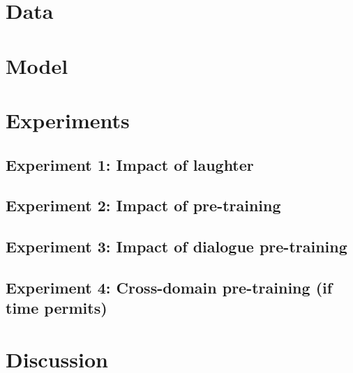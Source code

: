 \documentclass[11pt,a4paper]{article}
\begin{document}
\section{Data}
  
\section{Model} %

\section{Experiments}
\subsection{Experiment 1: Impact of laughter}   %

\subsection{Experiment 2: Impact of pre-training}

\subsection{Experiment 3: Impact of dialogue pre-training}

\subsection{Experiment 4: Cross-domain pre-training (if time permits)}

\section{Discussion} %



\end{document}
